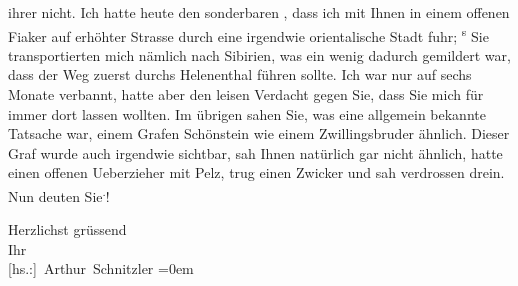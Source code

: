                ihrer nicht. Ich hatte heute den sonderbaren \label{K_L03779-4v}\label{K_L03779-4}, dass
               ich mit Ihnen in einem offenen Fiaker auf erhöhter Strasse durch eine irgendwie
               orientalische Stadt fuhr; \substVorne{}\textsuperscript{s }\substDazwischen{}S\substHinten{}ie transportierten mich nämlich nach Sibirien, was ein wenig dadurch gemildert war, dass der Weg zuerst durchs
                  Helenenthal führen sollte. Ich war nur auf
               sechs Monate verbannt, hatte aber den leisen Verdacht gegen Sie, dass Sie mich für
               immer dort lassen wollten. Im übrigen sahen Sie, was eine allgemein bekannte Tatsache
               war, einem Grafen Schönstein wie einem Zwillingsbruder ähnlich. Dieser Graf wurde
               auch irgendwie sichtbar, sah Ihnen natürlich gar nicht ähnlich, hatte einen offenen
               Ueberzieher mit Pelz, trug einen Zwicker und sah verdrossen drein. Nun deuten Sie\substVorne{}\textsuperscript{.}\substDazwischen{}!\substHinten{}\pend
           
\pstart
           Herzlichst grüssend{\\[\baselineskip]}Ihr{\\[\baselineskip]}\spacefill\mbox{{[}hs.:{]} Arthur Schnitzler}\pend
           \leftskip=0em{}\endnumbering{}
\begin{anhang}
\end{anhang}
      